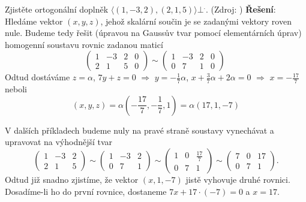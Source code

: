 \begin{mdframed}[style=mdexam]
  \begin{example}\label{mai:exam011}
    Zjistěte ortogonální doplněk \(\langle(1,-3,2),(2,1,5)\rangle\bot^.\). (Zdroj:
    \cite[s.~3]{MosnaMA3}) \newline\textbf{Řešení}: Hledáme vektor \((x, y, z)\), jehož skalární
    součin je se zadanými vektory roven nule. Budeme tedy řešit (úpravou na Gaussův tvar pomocí
    elementárních úprav) homogenní soustavu rovnic zadanou maticí
    \begin{equation*}
      \left(
        \begin{array}{ccc|c}
            1  &  -3  & 2 & 0 \\
            2  &   1  & 5 & 0
        \end{array}
      \right)\sim
      \left(
        \begin{array}{ccc|c}
            1  &  -3  & 2 & 0 \\
            0  &   7  & 1 & 0
        \end{array}
      \right)\
    \end{equation*}
    Odtud dostáváme \(z = \alpha\), \(7y + z = 0\) \(\Rightarrow\) \(y = -\frac{1}{7}\alpha\), \(x
    +\frac{3}{7}\alpha + 2\alpha = 0\) \(\Rightarrow\) \(x = -\frac{17}{7}\) neboli 
    \begin{equation*}
    (x, y, z) =\alpha\left(-\frac{17}{7}, -\frac{1}{7}, 1\right) = \alpha(17, 1, -7)
    \end{equation*}

    V dalších příkladech budeme nuly na pravé straně soustavy vynechávat a upravovat na výhodnější
    tvar
    \begin{equation*}
        \begin{pmatrix}
            1  &  -3  & 2  \\
            2  &   1  & 5
        \end{pmatrix}
        \sim
        \begin{pmatrix}
            1  &  -3  & 2 \\
            0  &   7  & 1
        \end{pmatrix}
        \sim
        \begin{pmatrix}
            1  &   0  & \frac{17}{7}  \\
            0  &   7  & 1
        \end{pmatrix}
        \sim
        \begin{pmatrix}
            7  &   0  & 17 \\
            0  &   7  & 1
        \end{pmatrix}.
    \end{equation*}
    Odtud již snadno zjistíme, že vektor \((x, 1, -7)\) jistě vyhovuje druhé rovnici. Dosadíme-li ho
    do první rovnice, dostaneme \(7x + 17\cdot(-7) = 0\) a \(x = 17\).


\end{example}
\end{mdframed}
